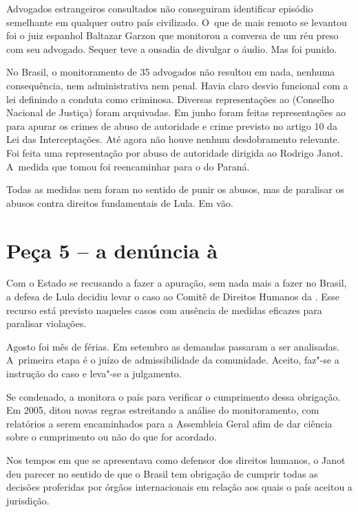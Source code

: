 Advogados estrangeiros consultados não conseguiram identificar episódio
semelhante em qualquer outro país civilizado. O~que de mais remoto se
levantou foi o juiz espanhol Baltazar Garzon que monitorou a conversa de
um réu preso com seu advogado. Sequer teve a ousadia de divulgar o
áudio. Mas foi punido.

No Brasil, o monitoramento de 35 advogados não resultou em nada, nenhuma
consequência, nem administrativa nem penal. Havia claro desvio funcional
com a lei definindo a conduta como criminosa. Diversas representações ao
 (Conselho Nacional de Justiça) foram arquivadas. Em junho foram
feitas representações ao  para apurar os crimes de abuso de
autoridade e crime previsto no artigo 10 da Lei das Interceptações. Até
agora não houve nenhum desdobramento relevante. Foi feita uma
representação por abuso de autoridade dirigida ao  Rodrigo Janot. A~medida que tomou foi reencaminhar para o  do Paraná.

Todas as medidas nem foram no sentido de punir os abusos, mas de
paralisar os abusos contra direitos fundamentais de Lula. Em vão.

\section{Peça 5 -- a denúncia à }

Com o Estado se recusando a fazer a apuração, sem nada mais a fazer no
Brasil, a defesa de Lula decidiu levar o caso ao Comitê de Direitos
Humanos da . Esse recurso está previsto naqueles casos com ausência
de medidas eficazes para paralisar violações.

Agosto foi mês de férias. Em setembro as demandas passaram a ser
analisadas. A~primeira etapa é o juízo de admissibilidade da comunidade.
Aceito, faz"-se a instrução do caso e leva"-se a julgamento.

Se condenado, a  monitora o país para verificar o cumprimento dessa
obrigação. Em 2005, ditou novas regras estreitando a análise do
monitoramento, com relatórios a serem encaminhados para a Assembleia
Geral afim de dar ciência sobre o cumprimento ou não do que for
acordado.

Nos tempos em que se apresentava como defensor dos direitos humanos, o
 Janot deu parecer no sentido de que o Brasil tem obrigação de
cumprir todas as decisões proferidas por órgãos internacionais em
relação aos quais o país aceitou a jurisdição.

